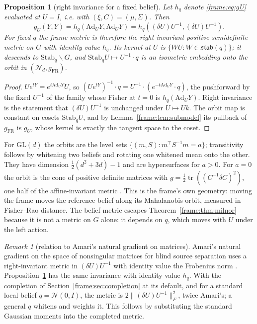 \documentclass[11pt]{article}
\newtheorem{proposition}[theorem]{Proposition}
\theoremstyle{definition}
\theoremstyle{remark}
\newtheorem{remark}[theorem]{Remark}
\providecommand{\GL}{\mathrm{GL}}
\providecommand{\tr}{\operatorname{tr}}
\providecommand{\Ad}{\mathrm{Ad}}
\providecommand{\stab}{\mathfrak{stab}}
\providecommand{\Stab}{\mathrm{Stab}}
\providecommand{\Normal}{\mathcal{N}}
\begin{document}
\begin{proposition}[right invariance for a fixed belief]\label{frame:prop:rightinv}
Let $h_q$ denote \eqref{frame:eq:gU} evaluated at $U=I$, i.e. with $(\xi,C)=(\mu,\Sigma)$. Then
\begin{equation}\label{frame:eq:rightinv}
g_U(Y,Y)=h_q(\Ad_UY,\Ad_UY)=h_q((\delta U)U^{-1},(\delta U)U^{-1}).
\end{equation}
For fixed $q$ the frame metric is therefore the right-invariant positive semidefinite metric on $G$ with identity value $h_q$. Its kernel at $U$ is $\{WU:W\in\stab(q)\}$; it descends to $\Stab_q\backslash G$, and $\Stab_qU\mapsto U^{-1}\cdot q$ is an isometric embedding onto the orbit in $(\Normal_d,g_{\mathrm{FR}})$.
\end{proposition}
\begin{proof}
$Ue^{tY}=e^{t\Ad_UY}U$, so $(Ue^{tY})^{-1}\cdot q=U^{-1}\cdot(e^{-t\Ad_UY}\cdot q)$, the pushforward by the fixed $U^{-1}$ of the family whose Fisher at $t=0$ is $h_q(\Ad_UY)$. Right invariance is the statement that $(\delta U)U^{-1}$ is unchanged under $U\mapsto Uk$. The orbit map is constant on cosets $\Stab_qU$, and by Lemma~\ref{frame:lem:submodel} its pullback of $g_{\mathrm{FR}}$ is $g_U$, whose kernel is exactly the tangent space to the coset.
\end{proof}

For $\GL(d)$ the orbits are the level sets $\{(m,S):m^\top S^{-1}m=a\}$; transitivity follows by whitening two beliefs and rotating one whitened mean onto the other. They have dimension $\frac12(d^2+3d)-1$ and are hypersurfaces for $a>0$. For $a=0$ the orbit is the cone of positive definite matrices with $g=\frac12\tr((C^{-1}\delta C)^2)$, one half of the affine-invariant metric \cite{frame:Skovgaard1984}. This is the frame's own geometry: moving the frame moves the reference belief along its Mahalanobis orbit, measured in Fisher--Rao distance. The belief metric escapes Theorem~\ref{frame:thm:milnor} because it is not a metric on $G$ alone: it depends on $q$, which moves with $U$ under the left action.

\begin{remark}[relation to Amari's natural gradient on matrices]\label{frame:rem:amari-bss}
Amari's natural gradient on the space of nonsingular matrices for blind source separation uses a right-invariant metric in $(\delta U)U^{-1}$ with identity value the Frobenius norm \cite{frame:Amari1998}. Proposition~\ref{frame:prop:rightinv} has the same invariance with identity value $h_q$. With the completion of Section~\ref{frame:sec:completion} at its default, and for a standard local belief $q=\Normal(0,I)$, the metric is $2\|(\delta U)U^{-1}\|_F^2$, twice Amari's; a general $q$ whitens and weights it. This follows by substituting the standard Gaussian moments into the completed metric.
\end{remark}
\end{document}
